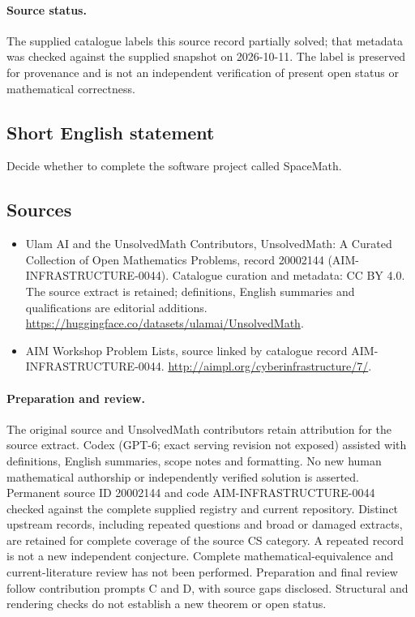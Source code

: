 \documentclass[11pt]{article}
\begin{document}
\paragraph{Source status.}
The supplied catalogue labels this source record partially solved; that metadata was checked against the supplied snapshot on 2026-10-11. The label is preserved for provenance and is not an independent verification of present open status or mathematical correctness.
\subsection{Short English statement}
Decide whether to complete the software project called SpaceMath.
\subsection{Sources}
\begin{itemize}
\item[\hypertarget{source:20002144:1}{S1}] Ulam AI and the UnsolvedMath Contributors, UnsolvedMath: A Curated Collection of Open Mathematics Problems, record 20002144 (AIM-INFRASTRUCTURE-0044). Catalogue curation and metadata: CC BY 4.0. The source extract is retained; definitions, English summaries and qualifications are editorial additions.
\url{https://huggingface.co/datasets/ulamai/UnsolvedMath}.
\item[\hypertarget{source:20002144:2}{S2}] AIM Workshop Problem Lists, source linked by catalogue record AIM-INFRASTRUCTURE-0044.
\url{http://aimpl.org/cyberinfrastructure/7/}.
\end{itemize}
\paragraph{Preparation and review.}
The original source and UnsolvedMath contributors retain attribution for the source extract. Codex (GPT-6; exact serving revision not exposed) assisted with definitions, English summaries, scope notes and formatting. No new human mathematical authorship or independently verified solution is asserted. Permanent source ID 20002144 and code AIM-INFRASTRUCTURE-0044 checked against the complete supplied registry and current repository. Distinct upstream records, including repeated questions and broad or damaged extracts, are retained for complete coverage of the source CS category. A repeated record is not a new independent conjecture. Complete mathematical-equivalence and current-literature review has not been performed. Preparation and final review follow contribution prompts C and D, with source gaps disclosed. Structural and rendering checks do not establish a new theorem or open status.
\label{end:20002144}
\end{document}
